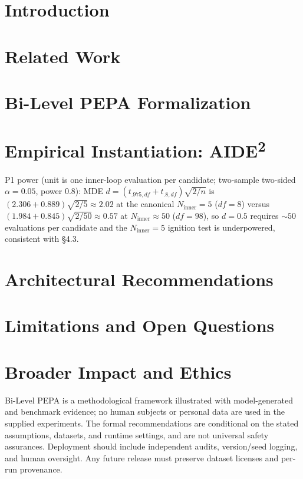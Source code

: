 \documentclass{article}
\theoremstyle{definition}
\begin{document}
\tableofcontents
\bigskip

\setcounter{section}{0}
\section{Introduction}


\section{Related Work}


\section{Bi-Level PEPA Formalization}


\section{Empirical Instantiation: AIDE\textsuperscript{2}}


P1 power (unit is one inner-loop evaluation per candidate; two-sample two-sided $\alpha{=}0.05$, power $0.8$): MDE $d{=}(t_{.975,df}{+}t_{.8,df})\sqrt{2/n}$ is $(2.306{+}0.889)\sqrt{2/5}{\approx}2.02$ at the canonical $N_{\mathrm{inner}}{=}5$ ($df{=}8$) versus $(1.984{+}0.845)\sqrt{2/50}{\approx}0.57$ at $N_{\mathrm{inner}}{\approx}50$ ($df{=}98$), so $d{=}0.5$ requires ${\sim}50$ evaluations per candidate and the $N_{\mathrm{inner}}{=}5$ ignition test is underpowered, consistent with \S4.3.

\section{Architectural Recommendations}


\section{Limitations and Open Questions}


\section{Broader Impact and Ethics}
Bi-Level PEPA is a methodological framework illustrated with model-generated and benchmark evidence; no human subjects or personal data are used in the supplied experiments. The formal recommendations are conditional on the stated assumptions, datasets, and runtime settings, and are not universal safety assurances. Deployment should include independent audits, version/seed logging, and human oversight. Any future release must preserve dataset licenses and per-run provenance.
\end{document}
